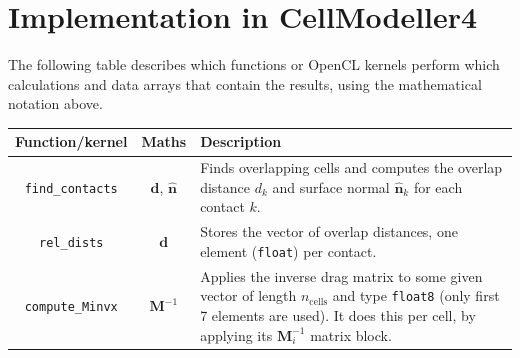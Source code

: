 \documentclass{report}
\let\oldhat\hat
\renewcommand{\vec}[1]{\mathbf{#1}}
\renewcommand{\hat}[1]{\oldhat{\mathbf{#1}}}
\newcommand{\mat}{\mathbf}
\newcommand{\invmat}[1]{\mat{#1}^{-1}}
\begin{document}
\section{Implementation in CellModeller4}
The following table describes which functions or OpenCL kernels perform which
calculations and data arrays that contain the results, using the mathematical notation above.

\begin{table}[H]
\begin{tabular}{c c  p{4in}}
\toprule
Function/kernel & Maths & Description\\
\midrule
\texttt{find\_contacts} & $\vec{d}$, $\hat{\vec{n}}$ & Finds overlapping cells
and computes the overlap distance $d_k$ and surface normal $\hat{\vec{n}}_k$ for
each contact $k$.\\
\addlinespace
\texttt{rel\_dists} & $\vec{d}$ & Stores the vector of overlap distances, one
element (\texttt{float}) per contact.\\
\addlinespace
\texttt{compute\_Minvx} & $\invmat{M}$ & Applies the inverse drag matrix to some
given vector of length $n_\mathrm{cells}$ and type \texttt{float8} (only first 7
elements are used). It does this per cell, by applying its $\invmat{M}_i$ matrix
block.\\
\bottomrule
\end{tabular}
\end{table}
\end{document}
